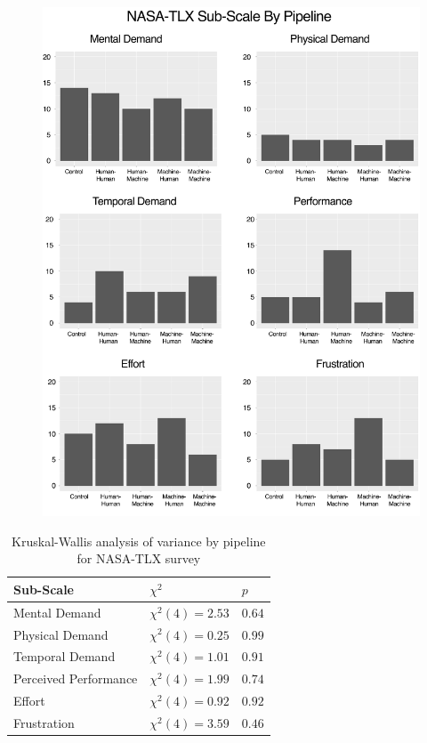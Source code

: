 \begin{figure}[htbp]
  \centering
  \includegraphics[width=\textwidth]{images/plot_tlx.pdf}
  \caption{}
  \label{fig:plot:tlx}
\end{figure}

\begin{table}[htbp]
  \centering
  \caption{Kruskal-Wallis analysis of variance by pipeline for NASA-TLX survey}
  \label{tab:tlx}
  {\tabulinesep=2mm
    \begin{singlespace}
    \begin{tabu} to 0.6\textwidth{|X[c]|X[c]|X[c]|}
        \hline
        Sub-Scale & $\chi^2$ & $p$ \\
        \hline\hline
        Mental Demand & $\chi^2(4) = 2.53$ & $0.64$ \\
        \hline
        Physical Demand & $\chi^2(4) = 0.25$ & $0.99$ \\
        \hline
        Temporal Demand & $\chi^2(4) = 1.01$ & $0.91$ \\
        \hline
        Perceived Performance & $\chi^2(4) = 1.99$ & $0.74$ \\
        \hline
        Effort & $\chi^2(4) = 0.92$ & $0.92$ \\
        \hline
        Frustration & $\chi^2(4) = 3.59$ & $0.46$ \\
    \hline
    \end{tabu}
    \end{singlespace}
    }
\end{table}

